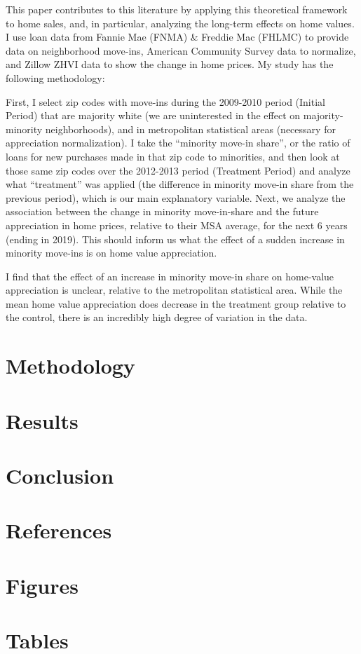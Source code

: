 \documentclass{article}
\begin{document}
This paper contributes to this literature by applying this theoretical framework to home sales, and, in particular, analyzing the long-term effects on home values. I use loan data from Fannie Mae (FNMA) \& Freddie Mac (FHLMC) to provide data on
neighborhood move-ins, American Community Survey data to normalize, and
Zillow ZHVI data to show the change in home prices. My study has the
following methodology:

First, I select zip codes with move-ins during the 2009-2010 period
(Initial Period) that are majority white (we are uninterested in the
effect on majority-minority neighborhoods), and in metropolitan
statistical areas (necessary for appreciation normalization). I take the
``minority move-in share'', or the ratio of loans for new purchases made
in that zip code to minorities, and then look at those same zip codes
over the 2012-2013 period (Treatment Period) and analyze what
``treatment'' was applied (the difference in minority move-in share from
the previous period), which is our main explanatory variable. Next, we
analyze the association between the change in minority move-in-share and
the future appreciation in home prices, relative to their MSA average,
for the next 6 years (ending in 2019). This should inform us what the
effect of a sudden increase in minority move-ins is on home value
appreciation.

I find that the effect of an increase in minority move-in share on
home-value appreciation is unclear, relative to the metropolitan
statistical area. While the mean home value appreciation does decrease
in the treatment group relative to the control, there is an incredibly
high degree of variation in the data.

\section{Methodology}
\section{Results}
\section{Conclusion}
\section{References}
\appendix
\section{Figures}
\section{Tables}
\end{document}
